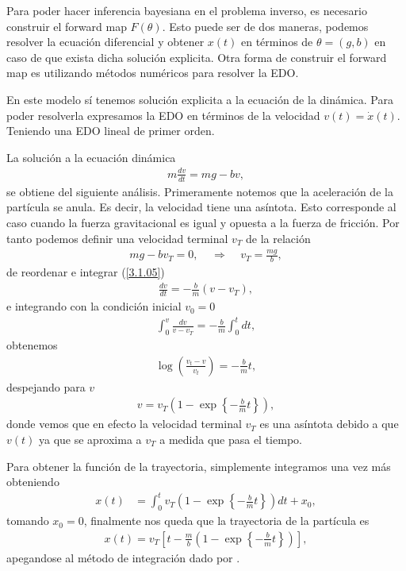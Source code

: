 Para poder hacer inferencia bayesiana en el problema inverso, es necesario construir el forward map $F(\theta)$. Esto puede ser de dos maneras, podemos resolver la ecuación diferencial y obtener $x(t)$ en términos de $\theta = (g,b)$ en caso de que exista dicha solución explicita. Otra forma de construir el forward map es utilizando métodos numéricos para resolver la EDO.

En este modelo sí tenemos solución explicita a la ecuación de la dinámica. Para poder resolverla expresamos la EDO en términos de la velocidad $v(t) = \dot{x}(t)$. Teniendo una EDO lineal de primer orden.

La solución a la ecuación dinámica
\begin{align}
    m \frac{dv}{dt} = mg - bv,
    \label{3.1.05}
\end{align}
se obtiene del siguiente análisis. Primeramente notemos que la aceleración de la partícula se anula. Es decir, la velocidad tiene una asíntota. Esto corresponde al caso cuando la fuerza gravitacional es igual y opuesta a la fuerza de fricción. Por tanto podemos definir una velocidad terminal $v_T$ de la relación
\begin{align}
    mg - bv_T = 0, \:\:\:\:\: \Rightarrow \:\:\:\:\: v_T = \frac{mg}{b},
    \label{3.1.06}
\end{align}
de reordenar e integrar (\ref{3.1.05}) 
\begin{align}
    \frac{dv}{dt } = -\frac{b}{m}(v - v_T),
    \label{3.1.07}
\end{align}
e integrando con la condición inicial $v_0 = 0$
\begin{align*}
    \int_{0}^{v} \frac{dv}{v - v_T} = -\frac{b}{m} \int_{0}^{t} dt,
\end{align*}
obtenemos
\begin{align*}
    \log{\left ( \frac{v_t - v }{v_t} \right )} = -\frac{b}{m}t,
\end{align*}
despejando para $v$ 
\begin{align}
    v = v_T \left ( 1- \exp \left \{{-\frac{b}{m}t} \right\} \right ),
\end{align}
donde vemos que en efecto la velocidad terminal $v_T$ es una asíntota debido a que  $v(t)$ ya que se aproxima a $v_T$ a medida que pasa el tiempo. 

Para obtener la función de la trayectoria, simplemente integramos una vez más obteniendo
\begin{align*}
    x(t) &= \int_{0}^{t} v_T \left ( 1 - \exp \left \{-\frac{b}{m}t \right \} \right ) d t + x_0,
\end{align*}
tomando $x_0 = 0$, finalmente nos queda que la trayectoria de la partícula es
\begin{align}
    x(t) = v_T \left [ t - \frac{m}{b} \left( 1- \exp\left\{-\frac{b}{m} t\right\}\right)\right],
    \label{3.1.12}
\end{align}
apegandose al método de integración dado por \cite{sears1986fisica}.


